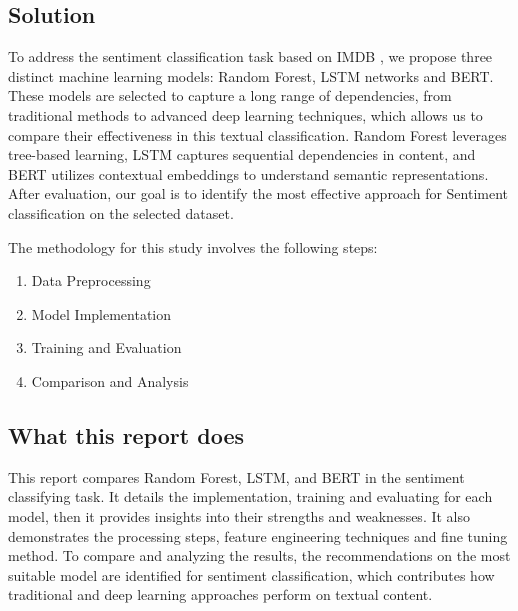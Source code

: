 \subsection{Solution}
To address the sentiment classification task based on IMDB \cite{stanfordnlp2025imdb}, we propose three distinct machine learning models: Random Forest, LSTM networks and BERT. These models are selected to capture a long range of dependencies, from traditional methods to advanced deep learning techniques, which allows us to compare their effectiveness in this textual classification. Random Forest leverages tree-based learning, LSTM captures sequential dependencies in content, and BERT utilizes contextual embeddings to understand semantic representations. After evaluation, our goal is to identify the most effective approach for Sentiment classification on the selected dataset.

The methodology for this study involves the following steps:
\begin{enumerate}
    \item Data Preprocessing
    \item Model Implementation
    \item Training and Evaluation
    \item Comparison and Analysis
\end{enumerate}


\subsection{What this report does}
This report compares Random Forest, LSTM, and BERT in the sentiment classifying task. It details the implementation, training and evaluating for each model, then it provides insights into their strengths and weaknesses. It also demonstrates the processing steps, feature engineering techniques and fine tuning method. To compare and analyzing the results, the recommendations on the most suitable model are identified for sentiment classification, which contributes how traditional and deep learning approaches perform on textual content.